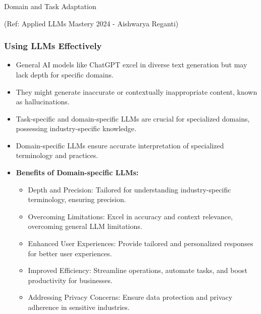\begin{frame}[fragile]\frametitle{}
\begin{center}
{\Large Domain and Task Adaptation}
\end{center}

{\tiny (Ref: Applied LLMs Mastery 2024 - Aishwarya Reganti)}

\end{frame}

\begin{frame}[fragile]\frametitle{Using LLMs Effectively}
  \begin{itemize}
    \item General AI models like ChatGPT excel in diverse text generation but may lack depth for specific domains.
    \item They might generate inaccurate or contextually inappropriate content, known as hallucinations.
    \item Task-specific and domain-specific LLMs are crucial for specialized domains, possessing industry-specific knowledge.
    \item Domain-specific LLMs ensure accurate interpretation of specialized terminology and practices.
    \item \textbf{Benefits of Domain-specific LLMs:}
      \begin{itemize}
        \item Depth and Precision: Tailored for understanding industry-specific terminology, ensuring precision.
        \item Overcoming Limitations: Excel in accuracy and context relevance, overcoming general LLM limitations.
        \item Enhanced User Experiences: Provide tailored and personalized responses for better user experiences.
        \item Improved Efficiency: Streamline operations, automate tasks, and boost productivity for businesses.
        \item Addressing Privacy Concerns: Ensure data protection and privacy adherence in sensitive industries.
      \end{itemize}
  \end{itemize}
\end{frame}

